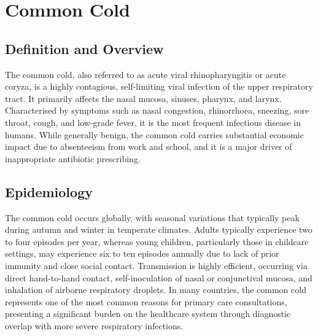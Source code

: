 \chapter{Common Cold}

\section*{Definition and Overview}
The common cold, also referred to as acute viral rhinopharyngitis or acute coryza, is a highly contagious, self-limiting viral infection of the upper respiratory tract. It primarily affects the nasal mucosa, sinuses, pharynx, and larynx. Characterised by symptoms such as nasal congestion, rhinorrhoea, sneezing, sore throat, cough, and low-grade fever, it is the most frequent infectious disease in humans. While generally benign, the common cold carries substantial economic impact due to absenteeism from work and school, and it is a major driver of inappropriate antibiotic prescribing.

\section*{Epidemiology}
The common cold occurs globally, with seasonal variations that typically peak during autumn and winter in temperate climates. Adults typically experience two to four episodes per year, whereas young children, particularly those in childcare settings, may experience six to ten episodes annually due to lack of prior immunity and close social contact. Transmission is highly efficient, occurring via direct hand-to-hand contact, self-inoculation of nasal or conjunctival mucosa, and inhalation of airborne respiratory droplets. In many countries, the common cold represents one of the most common reasons for primary care consultations, presenting a significant burden on the healthcare system through diagnostic overlap with more severe respiratory infections.

